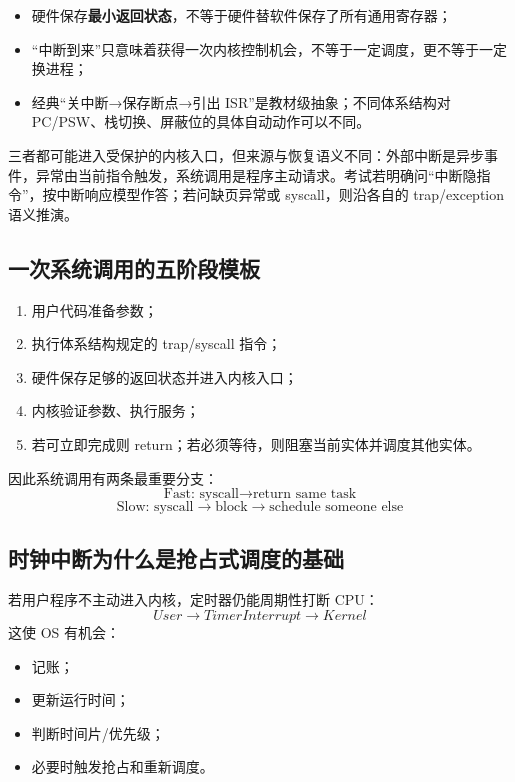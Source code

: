 \documentclass[11pt,a4paper]{ctexart}
\newcommand{\kw}[1]{\textbf{#1}}
\begin{document}
\begin{exam}[408 高频辨析]
\begin{itemize}
\item 硬件保存\kw{最小返回状态}，不等于硬件替软件保存了所有通用寄存器；
\item “中断到来”只意味着获得一次内核控制机会，不等于一定调度，更不等于一定换进程；
\item 经典“关中断→保存断点→引出 ISR”是教材级抽象；不同体系结构对 PC/PSW、栈切换、屏蔽位的具体自动动作可以不同。
\end{itemize}
\end{exam}

\begin{warn}[中断、异常与系统调用不要机械套同一条微观顺序]
三者都可能进入受保护的内核入口，但来源与恢复语义不同：外部中断是异步事件，异常由当前指令触发，系统调用是程序主动请求。考试若明确问“中断隐指令”，按中断响应模型作答；若问缺页异常或 syscall，则沿各自的 trap/exception 语义推演。
\end{warn}

\subsection{一次系统调用的五阶段模板}

\begin{enumerate}
\item 用户代码准备参数；
\item 执行体系结构规定的 trap/syscall 指令；
\item 硬件保存足够的返回状态并进入内核入口；
\item 内核验证参数、执行服务；
\item 若可立即完成则 return；若必须等待，则阻塞当前实体并调度其他实体。
\end{enumerate}

因此系统调用有两条最重要分支：
\[
\boxed{\text{Fast: syscall}\rightarrow\text{return same task}}
\]
\[
\boxed{\text{Slow: syscall}\rightarrow\text{block}\rightarrow\text{schedule someone else}}
\]

\subsection{时钟中断为什么是抢占式调度的基础}

若用户程序不主动进入内核，定时器仍能周期性打断 CPU：
\[
User\rightarrow TimerInterrupt\rightarrow Kernel
\]
这使 OS 有机会：
\begin{itemize}
\item 记账；
\item 更新运行时间；
\item 判断时间片/优先级；
\item 必要时触发抢占和重新调度。
\end{itemize}
\end{document}
